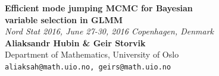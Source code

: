\documentclass[a0,portrait]{a0poster}
\begin{document}


\begin{minipage}[b]{0.75\linewidth}
\veryHuge \color{NavyBlue} \textbf{Efficient mode jumping MCMC for Bayesian\\ variable selection in GLMM} \color{Black}\\[1cm] %
\Huge\textit{Nord Stat 2016, June 27-30, 2016 Copenhagen, Denmark}\\[2cm] %
\huge \textbf{Aliaksandr Hubin \& Geir Storvik}\\[0.5cm] %
\huge Department of Mathematics, University of Oslo\\[0.4cm] %
\Large \texttt{aliaksah@math.uio.no, geirs@math.uio.no}\\
\end{minipage}
%
\end{document}
